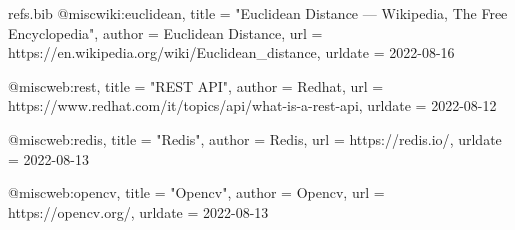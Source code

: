 \begin{filecontents*}[overwrite]{refs.bib}
@misc{wiki:euclidean,
  title = "Euclidean Distance --- {W}ikipedia{,} The Free Encyclopedia",
  author = {{Euclidean Distance}},
  url = {https://en.wikipedia.org/wiki/Euclidean\_distance},
  urldate = {2022-08-16}
}

@misc{web:rest,
  title = "REST API",
  author = {{Redhat}},
  url = {https://www.redhat.com/it/topics/api/what-is-a-rest-api},
  urldate = {2022-08-12}
}

@misc{web:redis,
  title = "Redis",
  author = {{Redis}},
  url = {https://redis.io/},
  urldate = {2022-08-13}
}

@misc{web:opencv,
  title = "Opencv",
  author = {{Opencv}},
  url = {https://opencv.org/},
  urldate = {2022-08-13}
}
\end{filecontents*}

\documentclass{article}

\usepackage[utf8]{inputenc}
\usepackage[T1]{fontenc}
\usepackage{enumitem}
\usepackage{graphicx}
\usepackage[font=small,labelfont=bf]{caption}
\usepackage[italian]{babel}
\usepackage{amsmath}
\usepackage{url}
\usepackage[hidelinks]{hyperref}
\usepackage{apacite}
\usepackage[noabbrev]{cleveref}
\usepackage[margin=1in]{geometry}





\begin{titlepage}
    \begin{center}
        \vspace*{1cm}

        {\Huge\bfseries Progetto Sistemi Multimediali\par}

        \vspace{0.5cm}

        {\LARGE Face recognition over HTTP\par}

        \vfill

        {\Large Giuseppe Capasso\\
        N46003195\par}

        \vspace{0.8cm}
    \end{center}
\end{titlepage}

\tableofcontents
\listoffigures
\clearpage

